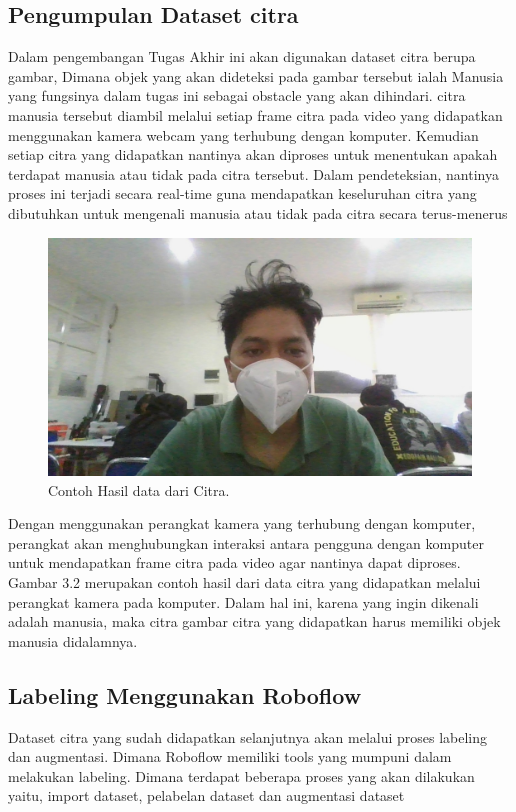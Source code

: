 \subsection{Pengumpulan Dataset citra
  \label{sec:Dataset Citra}}
Dalam pengembangan Tugas Akhir ini akan digunakan dataset citra berupa gambar, Dimana objek yang akan dideteksi pada gambar tersebut ialah Manusia yang fungsinya dalam tugas ini sebagai obstacle yang akan dihindari. citra manusia tersebut diambil melalui setiap frame citra pada video yang didapatkan menggunakan kamera webcam yang terhubung dengan komputer. Kemudian setiap citra yang didapatkan nantinya akan diproses untuk menentukan apakah terdapat manusia atau tidak pada citra tersebut. Dalam pendeteksian, nantinya proses ini terjadi secara real-time guna mendapatkan keseluruhan citra yang dibutuhkan untuk mengenali manusia atau tidak pada citra secara terus-menerus

\begin{figure}[H]
  \centering
  \includegraphics[scale=0.3]{gambar/WIN_20240319_17_11_26_Pro.jpg}
  \caption{Contoh Hasil data dari Citra.}
  \label{fig:Hasil Data dari Citra}
\end{figure}

Dengan menggunakan perangkat kamera yang terhubung dengan komputer, perangkat akan menghubungkan interaksi antara pengguna dengan komputer untuk mendapatkan frame citra pada video agar nantinya dapat diproses. Gambar 3.2 merupakan contoh hasil dari data citra yang didapatkan melalui perangkat kamera pada komputer. Dalam hal ini, karena yang ingin dikenali adalah manusia, maka citra gambar citra yang didapatkan harus memiliki objek manusia didalamnya.

\subsection{Labeling Menggunakan Roboflow}
Dataset citra yang sudah didapatkan selanjutnya akan melalui proses labeling dan augmentasi. Dimana Roboflow memiliki tools yang mumpuni dalam melakukan labeling. Dimana terdapat beberapa proses yang akan dilakukan yaitu, import dataset, pelabelan dataset dan augmentasi dataset

